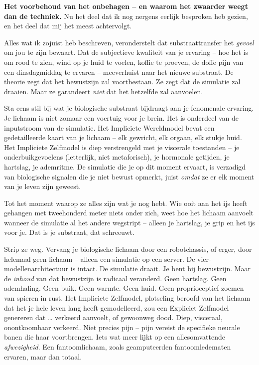 \documentclass[11pt, twoside, openright]{book}
\begin{document}
\textbf{Het voorbehoud van het onbehagen -- en waarom het zwaarder weegt dan de techniek.} Nu het deel dat ik nog nergens eerlijk besproken heb gezien, en het deel dat mij het meest achtervolgt.

Alles wat ik zojuist heb beschreven, veronderstelt dat substraattransfer het \textit{gevoel} om jou te zijn bewaart. Dat de subjectieve kwaliteit van je ervaring -- hoe het is om rood te zien, wind op je huid te voelen, koffie te proeven, de doffe pijn van een dinsdagmiddag te ervaren -- meeverhuist naar het nieuwe substraat. De theorie zegt dat het bewustzijn zal voortbestaan. Ze zegt dat de simulatie zal draaien. Maar ze garandeert \textit{niet} dat het hetzelfde zal aanvoelen.

Sta eens stil bij wat je biologische substraat bijdraagt aan je fenomenale ervaring. Je lichaam is niet zomaar een voertuig voor je brein. Het is onderdeel van de inputstroom van de simulatie. Het Impliciete Wereldmodel bevat een gedetailleerde kaart van je lichaam -- elk gewricht, elk orgaan, elk stukje huid. Het Impliciete Zelfmodel is diep verstrengeld met je viscerale toestanden -- je onderbuikgevoelens (letterlijk, niet metaforisch), je hormonale getijden, je hartslag, je ademritme. De simulatie die je op dit moment ervaart, is verzadigd van biologische signalen die je niet bewust opmerkt, juist \textit{omdat} ze er elk moment van je leven zijn geweest.

Tot het moment waarop ze alles zijn wat je nog hebt. Wie ooit aan het ijs heeft gehangen met tweehonderd meter niets onder zich, weet hoe het lichaam aanvoelt wanneer de simulatie al het andere wegstript -- alleen je hartslag, je grip en het ijs voor je. Dat is je substraat, dat schreeuwt.

Strip ze weg. Vervang je biologische lichaam door een robotchassis, of erger, door helemaal geen lichaam -- alleen een simulatie op een server. De vier-modellenarchitectuur is intact. De simulatie draait. Je bent bij bewustzijn. Maar de \textit{inhoud} van dat bewustzijn is radicaal veranderd. Geen hartslag. Geen ademhaling. Geen buik. Geen warmte. Geen huid. Geen proprioceptief zoemen van spieren in rust. Het Impliciete Zelfmodel, plotseling beroofd van het lichaam dat het je hele leven lang heeft gemodelleerd, zou een Expliciet Zelfmodel genereren dat … verkeerd aanvoelt, of gewoonweg dood. Diep, visceraal, onontkoombaar verkeerd. Niet precies pijn -- pijn vereist de specifieke neurale banen die haar voortbrengen. Iets wat meer lijkt op een allesomvattende \textit{afwezigheid}. Een fantoomlichaam, zoals geamputeerden fantoomledematen ervaren, maar dan totaal.
\end{document}
